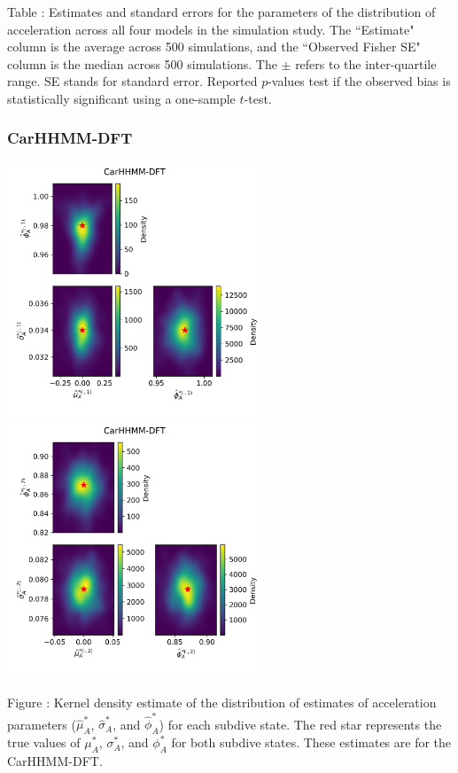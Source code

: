 \documentclass{article}
\begin{document}
        \noindent Table : Estimates and standard errors for the parameters of the distribution of acceleration across all four models in the simulation study. The ``Estimate" column is the average across 500 simulations, and the ``Observed Fisher SE" column is the median across 500 simulations. The $\pm$ refers to the inter-quartile range. SE stands for standard error. Reported $p$-values test if the observed bias is statistically significant using a one-sample $t$-test.
        \addtocounter{tablenum}{1}
    
        \subsubsection{CarHHMM-DFT}
        \begin{center}
        \includegraphics[width=3in]{../Plots/hhmm_FV_MLE_density_A_0_0.png}
        \includegraphics[width=3in]{../Plots/hhmm_FV_MLE_density_A_0_1.png}
        \end{center}
        
        \noindent Figure : Kernel density estimate of the distribution of estimates of acceleration parameters ($\hat \mu^*_A$, $\hat \sigma^*_A$, and $\hat \phi^*_A$) for each subdive state. The red star represents the true values of $\mu^*_A$, $\sigma^*_A$, and $\phi^*_A$ for both subdive states. These estimates are for the CarHHMM-DFT.
        \addtocounter{fignum}{1}
        
\end{document}
